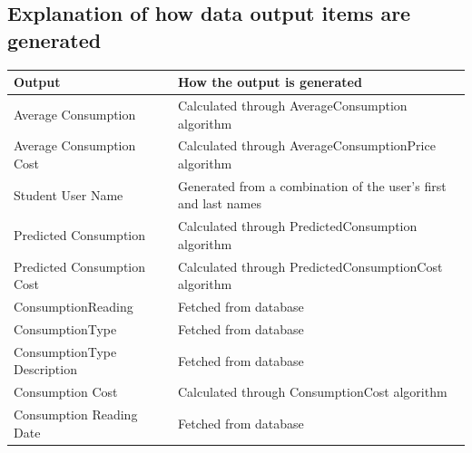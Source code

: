 \subsection{Explanation of how data output items are generated}
\begin{center}
\begin{tabular}{|p{5cm}|p{7.5cm}|}
	\hline
	\textbf{Output} & \textbf{How the output is generated} \\ \hline
	Average Consumption &  Calculated through AverageConsumption algorithm \\ \hline
	Average Consumption Cost & Calculated through AverageConsumptionPrice algorithm \\ \hline
	Student User Name & Generated from a combination of the user's first and last names \\ \hline
	Predicted Consumption & Calculated through PredictedConsumption algorithm \\ \hline
	Predicted Consumption Cost & Calculated through PredictedConsumptionCost algorithm \\ \hline
	ConsumptionReading & Fetched from database \\ \hline
	ConsumptionType & Fetched from database \\ \hline
	ConsumptionType Description & Fetched from database \\ \hline
	Consumption Cost & Calculated through ConsumptionCost algorithm \\ \hline
	Consumption Reading Date & Fetched from database \\ \hline
\end{tabular}
\end{center}

